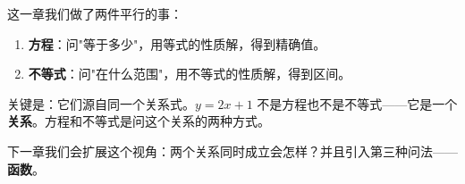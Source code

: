 
这一章我们做了两件平行的事：

\begin{enumerate}
  \item \textbf{方程}：问"等于多少"，用等式的性质解，得到精确值。
  \item \textbf{不等式}：问"在什么范围"，用不等式的性质解，得到区间。
\end{enumerate}

关键是：它们源自同一个关系式。$y = 2x+1$ 不是方程也不是不等式——它是一个\textbf{关系}。方程和不等式是问这个关系的两种方式。

下一章我们会扩展这个视角：两个关系同时成立会怎样？并且引入第三种问法——\textbf{函数}。
